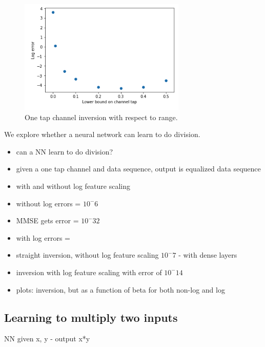 \begin{figure}
\begin{center}
\includegraphics{figures/equal/One_tap_channel_inversion.png}
\caption{One tap channel inversion with respect to range.}
\end{center}
\label{fig:one_tap_inv}
\end{figure}

We explore whether a neural network can learn to do division.  

\begin{itemize}
\item can a NN learn to do division?
\item given a one tap channel and data sequence, output is equalized data sequence
\item with and without log feature scaling
\item without log errors = $10^-6$
\item MMSE gets error = $10^-32$
\item with log errors = 
\item straight inversion, without log feature scaling $10^-7$ - with dense layers
\item inversion with log feature scaling with error of $10^-14$ 
\item plots: inversion, but as a function of beta for both non-log and log
\end{itemize}


\subsection{Learning to multiply two inputs}
NN given x, y - output x*y

